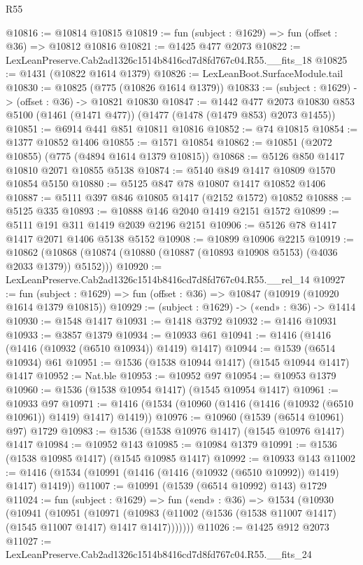 \begin{lexlean}{R55}
\begin{coremodule}
{{@10816 := @10814 @10815
@10819 := fun (subject : @1629) => fun (offset : @36) => @10812 @10816
@10821 := @1425 @477 @2073
@10822 := LexLeanPreserve.Cab2ad1326c1514b8416cd7d8fd767c04.R55.__fits_18
@10825 := @1431 (@10822 @1614 @1379)
@10826 := LexLeanBoot.SurfaceModule.tail
@10830 := @10825 (@775 (@10826 @1614 @1379))
@10833 := (subject : @1629) -> (offset : @36) -> @10821 @10830
@10847 := @1442
    @477
    @2073
    @10830
    @853
    @5100
    (@1461 (@1471 @477))
    (@1477 (@1478 (@1479 @853) @2073 @1455))
@10851 := @6914 @441 @851 @10811 @10816
@10852 := @74 @10815
@10854 := @1377 @10852 @1406
@10855 := @1571 @10854
@10862 := @10851 (@2072 @10855) (@775 (@4894 @1614 @1379 @10815))
@10868 := @5126 @850 @1417 @10810 @2071 @10855 @5138
@10874 := @5140 @849 @1417 @10809 @1570 @10854 @5150
@10880 := @5125 @847 @78 @10807 @1417 @10852 @1406
@10887 := @5111 @397 @846 @10805 @1417 (@2152 @1572) @10852
@10888 := @5125 @335
@10893 := @10888 @146 @2040 @1419 @2151 @1572
@10899 := @5111 @191 @311 @1419 @2039 @2196 @2151
@10906 := @5126 @78 @1417 @1417 @2071 @1406 @5138 @5152
@10908 := @10899 @10906 @2215
@10919 := @10862 (@10868 (@10874 (@10880 (@10887 (@10893 @10908 @5153) (@4036 @2033 @1379)) @5152)))
@10920 := LexLeanPreserve.Cab2ad1326c1514b8416cd7d8fd767c04.R55.__rel_14
@10927 := fun (subject : @1629) => fun (offset : @36) => @10847 (@10919 (@10920 @1614 @1379 @10815))
@10929 := (subject : @1629) -> («end» : @36) -> @1414
@10930 := @1548 @1417
@10931 := @1418 @3792
@10932 := @1416 @10931
@10933 := @3857 @1379
@10934 := @10933 @61
@10941 := @1416 (@1416 (@1416 (@10932 (@6510 @10934)) @1419) @1417)
@10944 := @1539 (@6514 @10934) @61
@10951 := @1536 (@1538 @10944 @1417) (@1545 @10944 @1417) @1417
@10952 := Nat.ble
@10953 := @10952 @97
@10954 := @10953 @1379
@10960 := @1536 (@1538 @10954 @1417) (@1545 @10954 @1417)
@10961 := @10933 @97
@10971 := @1416 (@1534 (@10960 (@1416 (@1416 (@10932 (@6510 @10961)) @1419) @1417) @1419))
@10976 := @10960 (@1539 (@6514 @10961) @97) @1729
@10983 := @1536 (@1538 @10976 @1417) (@1545 @10976 @1417) @1417
@10984 := @10952 @143
@10985 := @10984 @1379
@10991 := @1536 (@1538 @10985 @1417) (@1545 @10985 @1417)
@10992 := @10933 @143
@11002 := @1416 (@1534 (@10991 (@1416 (@1416 (@10932 (@6510 @10992)) @1419) @1417) @1419))
@11007 := @10991 (@1539 (@6514 @10992) @143) @1729
@11024 := fun (subject : @1629) =>
  fun («end» : @36) =>
  @1534
    (@10930
      (@10941
        (@10951
          (@10971
            (@10983 (@11002 (@1536 (@1538 @11007 @1417) (@1545 @11007 @1417) @1417 @1417)))))))
@11026 := @1425 @912 @2073
@11027 := LexLeanPreserve.Cab2ad1326c1514b8416cd7d8fd767c04.R55.__fits_24
}}
\end{coremodule}
\end{lexlean}
